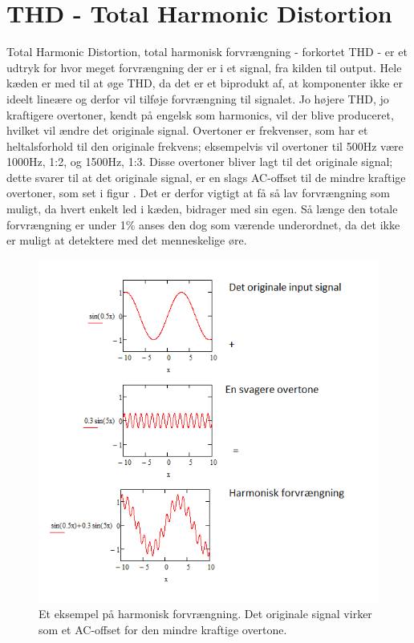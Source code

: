 \section{THD - Total Harmonic Distortion}
\label{thd}
Total Harmonic Distortion, total harmonisk forvrængning - forkortet THD - er et udtryk for hvor meget forvrængning der er i et signal, fra kilden til output.  Hele kæden er med til at øge THD, da det er et biprodukt af, at komponenter ikke er ideelt lineære og derfor vil tilføje forvrængning til signalet. Jo højere THD, jo kraftigere overtoner, kendt på engelsk som harmonics, vil der blive produceret, hvilket vil ændre det originale signal. Overtoner er frekvenser, som har et heltalsforhold til den originale frekvens; eksempelvis vil overtoner til 500Hz være 1000Hz, 1:2, og 1500Hz, 1:3. Disse overtoner bliver lagt til det originale signal; dette svarer til at det originale signal, er en slags AC-offset til de mindre kraftige overtoner, som set i figur . Det er derfor vigtigt at få så lav forvrængning som muligt, da hvert enkelt led i kæden, bidrager med sin egen. Så længe den totale forvrængning er under 1\% anses den dog som værende underordnet, da det ikke er muligt at detektere med det menneskelige øre.

\begin{figure}[h]
\centering
\includegraphics[scale=.75]{indledende_analyse/thd/harmonic_distortion.png}
\caption{Et eksempel på harmonisk forvrængning. Det originale signal virker som et AC-offset for den mindre kraftige overtone.}
\label{fig:harmonic_distortion}
\end{figure}